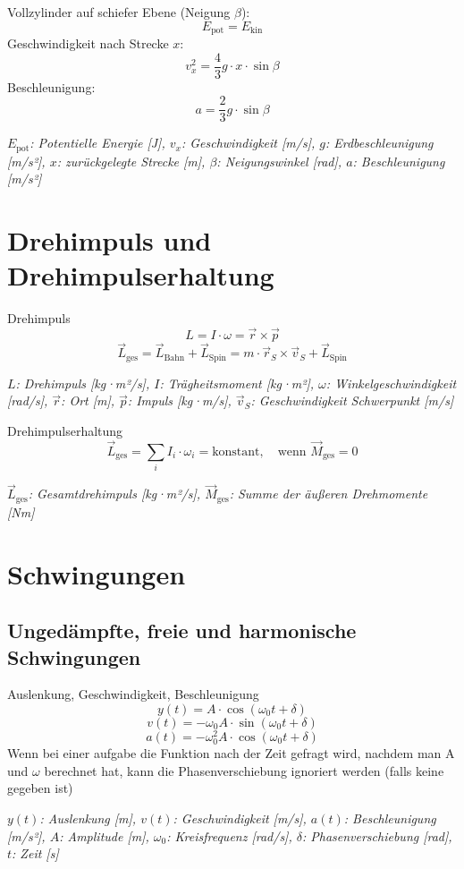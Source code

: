 \documentclass[a4paper,10pt]{article}
\newenvironment{displayformula}
{
	\begin{framed}
		\color{formulaColor}
	}
	{\end{framed}}
\newcommand{\formulalegend}[1]{%
	\par\vspace{0.5ex}%
	{{\color{legendColor}\RaggedRight\small\textit{#1}}}%
	\par\vspace{1.5ex}%
}
\begin{document}
\begin{displayformula}
	Vollzylinder auf schiefer Ebene (Neigung \( \beta \)):
	\[
	E_{\text{pot}} = E_{\text{kin}}
	\]
	Geschwindigkeit nach Strecke \( x \):
	\[
	v_x^2 = \frac{4}{3} g \cdot x \cdot \sin\beta
	\]
	Beschleunigung:
	\[
	a = \frac{2}{3} g \cdot \sin\beta
	\]
\end{displayformula}
\formulalegend{
	\( E_{\text{pot}} \): Potentielle Energie [J], \( v_x \): Geschwindigkeit [m/s], \( g \): Erdbeschleunigung [m/s²], \( x \): zurückgelegte Strecke [m], \( \beta \): Neigungswinkel [rad], \( a \): Beschleunigung [m/s²]
}

\section{Drehimpuls und Drehimpulserhaltung}

\begin{displayformula}
	Drehimpuls
	\[
	L = I \cdot \omega = \vec{r} \times \vec{p}
	\]
	\[
	\vec{L}_{\text{ges}} = \vec{L}_{\text{Bahn}} + \vec{L}_{\text{Spin}} = m \cdot \vec{r}_S \times \vec{v}_S + \vec{L}_{\text{Spin}}
	\]
\end{displayformula}
\formulalegend{
	\( L \): Drehimpuls [kg·m²/s], \( I \): Trägheitsmoment [kg·m²], \( \omega \): Winkelgeschwindigkeit [rad/s], \( \vec{r} \): Ort [m], \( \vec{p} \): Impuls [kg·m/s], \( \vec{v}_S \): Geschwindigkeit Schwerpunkt [m/s]
}

\begin{displayformula}
	Drehimpulserhaltung
	\[
	\vec{L}_{\text{ges}} = \sum_i I_i \cdot \omega_i = \text{konstant}, \quad \text{wenn } \vec{M}_{\text{ges}} = 0
	\]
\end{displayformula}
\formulalegend{
	\( \vec{L}_{\text{ges}} \): Gesamtdrehimpuls [kg·m²/s], \( \vec{M}_{\text{ges}} \): Summe der äußeren Drehmomente [Nm]
}

\section{Schwingungen}

\subsection{Ungedämpfte, freie und harmonische Schwingungen}

\begin{displayformula}
	Auslenkung, Geschwindigkeit, Beschleunigung
	\[
	y(t) = A \cdot \cos(\omega_0 t + \delta)
	\]
	\[
	v(t) = -\omega_0 A \cdot \sin(\omega_0 t + \delta)
	\]
	\[
	a(t) = -\omega_0^2 A \cdot \cos(\omega_0 t + \delta)
	\]
	Wenn bei einer aufgabe die Funktion nach der Zeit gefragt wird, nachdem man A und $\omega$ berechnet hat, kann die Phasenverschiebung ignoriert werden (falls keine gegeben ist)
\end{displayformula}
\formulalegend{
	\( y(t) \): Auslenkung [m], \( v(t) \): Geschwindigkeit [m/s], \( a(t) \): Beschleunigung [m/s²], \( A \): Amplitude [m], \( \omega_0 \): Kreisfrequenz [rad/s], \( \delta \): Phasenverschiebung [rad], \( t \): Zeit [s]
}
\end{document}
